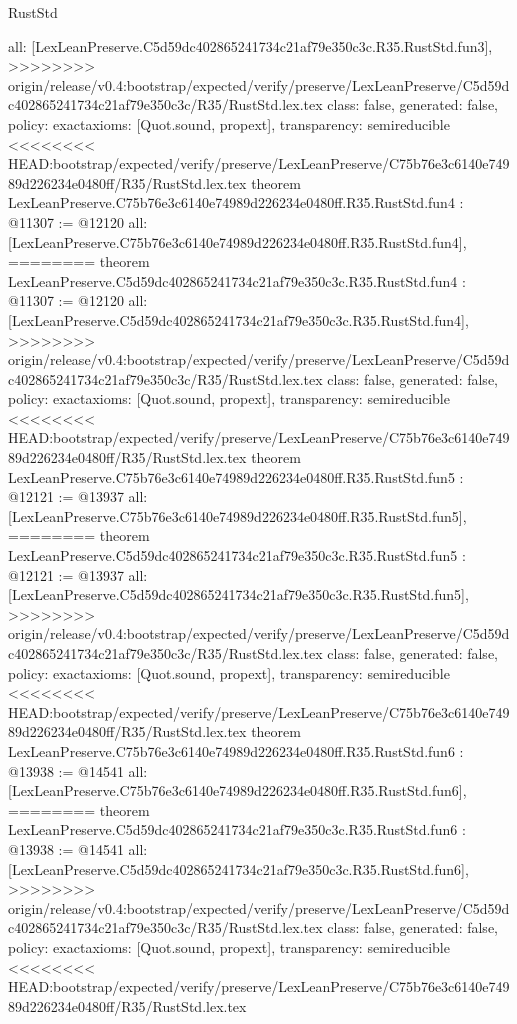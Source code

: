\begin{lexlean}{RustStd}
\begin{coremodule}
{\begin{coremodule}
{{{{{{{  all: [LexLeanPreserve.C5d59dc402865241734c21af79e350c3c.R35.RustStd.fun3],
>>>>>>>> origin/release/v0.4:bootstrap/expected/verify/preserve/LexLeanPreserve/C5d59dc402865241734c21af79e350c3c/R35/RustStd.lex.tex
  class: false,
  generated: false,
  policy: exact{axioms: [Quot.sound, propext]},
  transparency: semireducible
}
<<<<<<<< HEAD:bootstrap/expected/verify/preserve/LexLeanPreserve/C75b76e3c6140e74989d226234e0480ff/R35/RustStd.lex.tex
theorem LexLeanPreserve.C75b76e3c6140e74989d226234e0480ff.R35.RustStd.fun4 : @11307 := @12120 {
  all: [LexLeanPreserve.C75b76e3c6140e74989d226234e0480ff.R35.RustStd.fun4],
========
theorem LexLeanPreserve.C5d59dc402865241734c21af79e350c3c.R35.RustStd.fun4 : @11307 := @12120 {
  all: [LexLeanPreserve.C5d59dc402865241734c21af79e350c3c.R35.RustStd.fun4],
>>>>>>>> origin/release/v0.4:bootstrap/expected/verify/preserve/LexLeanPreserve/C5d59dc402865241734c21af79e350c3c/R35/RustStd.lex.tex
  class: false,
  generated: false,
  policy: exact{axioms: [Quot.sound, propext]},
  transparency: semireducible
}
<<<<<<<< HEAD:bootstrap/expected/verify/preserve/LexLeanPreserve/C75b76e3c6140e74989d226234e0480ff/R35/RustStd.lex.tex
theorem LexLeanPreserve.C75b76e3c6140e74989d226234e0480ff.R35.RustStd.fun5 : @12121 := @13937 {
  all: [LexLeanPreserve.C75b76e3c6140e74989d226234e0480ff.R35.RustStd.fun5],
========
theorem LexLeanPreserve.C5d59dc402865241734c21af79e350c3c.R35.RustStd.fun5 : @12121 := @13937 {
  all: [LexLeanPreserve.C5d59dc402865241734c21af79e350c3c.R35.RustStd.fun5],
>>>>>>>> origin/release/v0.4:bootstrap/expected/verify/preserve/LexLeanPreserve/C5d59dc402865241734c21af79e350c3c/R35/RustStd.lex.tex
  class: false,
  generated: false,
  policy: exact{axioms: [Quot.sound, propext]},
  transparency: semireducible
}
<<<<<<<< HEAD:bootstrap/expected/verify/preserve/LexLeanPreserve/C75b76e3c6140e74989d226234e0480ff/R35/RustStd.lex.tex
theorem LexLeanPreserve.C75b76e3c6140e74989d226234e0480ff.R35.RustStd.fun6 : @13938 := @14541 {
  all: [LexLeanPreserve.C75b76e3c6140e74989d226234e0480ff.R35.RustStd.fun6],
========
theorem LexLeanPreserve.C5d59dc402865241734c21af79e350c3c.R35.RustStd.fun6 : @13938 := @14541 {
  all: [LexLeanPreserve.C5d59dc402865241734c21af79e350c3c.R35.RustStd.fun6],
>>>>>>>> origin/release/v0.4:bootstrap/expected/verify/preserve/LexLeanPreserve/C5d59dc402865241734c21af79e350c3c/R35/RustStd.lex.tex
  class: false,
  generated: false,
  policy: exact{axioms: [Quot.sound, propext]},
  transparency: semireducible
}
<<<<<<<< HEAD:bootstrap/expected/verify/preserve/LexLeanPreserve/C75b76e3c6140e74989d226234e0480ff/R35/RustStd.lex.tex
}}}}}}}}}
\end{coremodule}}
\end{coremodule}
\end{lexlean}
